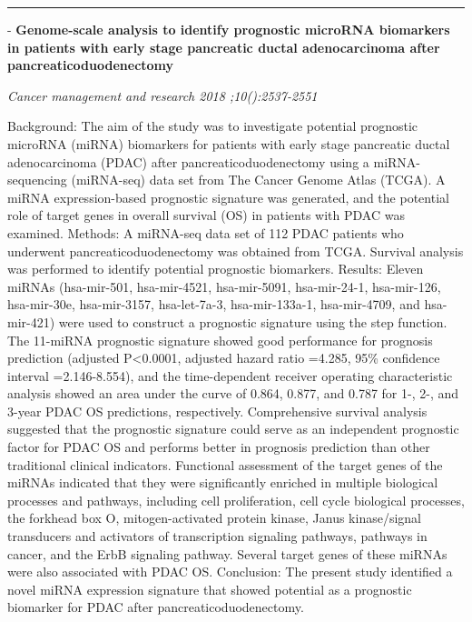 \documentclass[]{article}
\begin{document}
{}

{}

\begin{center}\rule{0.5\linewidth}{\linethickness}\end{center}

 - \textbf{Genome-scale analysis to identify prognostic microRNA
biomarkers in patients with early stage pancreatic ductal adenocarcinoma
after pancreaticoduodenectomy}

\emph{Cancer management and research 2018 ;10():2537-2551}

Background: The aim of the study was to investigate potential prognostic
microRNA (miRNA) biomarkers for patients with early stage pancreatic
ductal adenocarcinoma (PDAC) after pancreaticoduodenectomy using a
miRNA-sequencing (miRNA-seq) data set from The Cancer Genome Atlas
(TCGA). A miRNA expression-based prognostic signature was generated, and
the potential role of target genes in overall survival (OS) in patients
with PDAC was examined. Methods: A miRNA-seq data set of 112 PDAC
patients who underwent pancreaticoduodenectomy was obtained from TCGA.
Survival analysis was performed to identify potential prognostic
biomarkers. Results: Eleven miRNAs (hsa-mir-501, hsa-mir-4521,
hsa-mir-5091, hsa-mir-24-1, hsa-mir-126, hsa-mir-30e, hsa-mir-3157,
hsa-let-7a-3, hsa-mir-133a-1, hsa-mir-4709, and hsa-mir-421) were used
to construct a prognostic signature using the step function. The
11-miRNA prognostic signature showed good performance for prognosis
prediction (adjusted P\textless{}0.0001, adjusted hazard ratio =4.285,
95\% confidence interval =2.146-8.554), and the time-dependent receiver
operating characteristic analysis showed an area under the curve of
0.864, 0.877, and 0.787 for 1-, 2-, and 3-year PDAC OS predictions,
respectively. Comprehensive survival analysis suggested that the
prognostic signature could serve as an independent prognostic factor for
PDAC OS and performs better in prognosis prediction than other
traditional clinical indicators. Functional assessment of the target
genes of the miRNAs indicated that they were significantly enriched in
multiple biological processes and pathways, including cell
proliferation, cell cycle biological processes, the forkhead box O,
mitogen-activated protein kinase, Janus kinase/signal transducers and
activators of transcription signaling pathways, pathways in cancer, and
the ErbB signaling pathway. Several target genes of these miRNAs were
also associated with PDAC OS. Conclusion: The present study identified a
novel miRNA expression signature that showed potential as a prognostic
biomarker for PDAC after pancreaticoduodenectomy.
\end{document}
